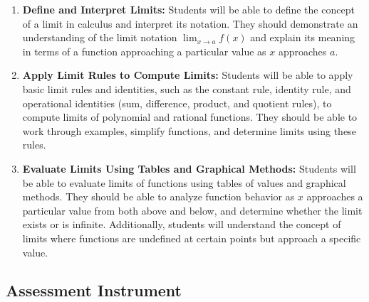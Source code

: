\begin{enumerate}
    \item \textbf{Define and Interpret Limits:} Students will be able to define the concept of a limit in calculus and interpret its notation. They should demonstrate an understanding of the limit notation $\lim_{x \to a} f(x)$ and explain its meaning in terms of a function approaching a particular value as $x$ approaches $a$.
    \item \textbf{Apply Limit Rules to Compute Limits:} Students will be able to apply basic limit rules and identities, such as the constant rule, identity rule, and operational identities (sum, difference, product, and quotient rules), to compute limits of polynomial and rational functions. They should be able to work through examples, simplify functions, and determine limits using these rules.
    \item \textbf{Evaluate Limits Using Tables and Graphical Methods:} Students will be able to evaluate limits of functions using tables of values and graphical methods. They should be able to analyze function behavior as $x$ approaches a particular value from both above and below, and determine whether the limit exists or is infinite. Additionally, students will understand the concept of limits where functions are undefined at certain points but approach a specific value.
\end{enumerate}

\subsection{Assessment Instrument}

